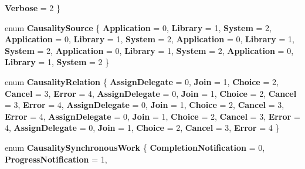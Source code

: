 \begin{DoxyCompactItemize}
{\bfseries Verbose} = 2
 \}
\item 
\mbox{\label{namespace_windows_1_1_foundation_1_1_diagnostics_a3a370b356cb758e027ffea6414919c72}} 
enum {\bfseries Causality\+Source} \{ \newline
{\bfseries Application} = 0, 
{\bfseries Library} = 1, 
{\bfseries System} = 2, 
{\bfseries Application} = 0, 
\newline
{\bfseries Library} = 1, 
{\bfseries System} = 2, 
{\bfseries Application} = 0, 
{\bfseries Library} = 1, 
\newline
{\bfseries System} = 2, 
{\bfseries Application} = 0, 
{\bfseries Library} = 1, 
{\bfseries System} = 2, 
\newline
{\bfseries Application} = 0, 
{\bfseries Library} = 1, 
{\bfseries System} = 2
 \}
\item 
\mbox{\label{namespace_windows_1_1_foundation_1_1_diagnostics_a45d3c9f2fddbec91a3035d3e79a246c8}} 
enum {\bfseries Causality\+Relation} \{ \newline
{\bfseries Assign\+Delegate} = 0, 
{\bfseries Join} = 1, 
{\bfseries Choice} = 2, 
{\bfseries Cancel} = 3, 
\newline
{\bfseries Error} = 4, 
{\bfseries Assign\+Delegate} = 0, 
{\bfseries Join} = 1, 
{\bfseries Choice} = 2, 
\newline
{\bfseries Cancel} = 3, 
{\bfseries Error} = 4, 
{\bfseries Assign\+Delegate} = 0, 
{\bfseries Join} = 1, 
\newline
{\bfseries Choice} = 2, 
{\bfseries Cancel} = 3, 
{\bfseries Error} = 4, 
{\bfseries Assign\+Delegate} = 0, 
\newline
{\bfseries Join} = 1, 
{\bfseries Choice} = 2, 
{\bfseries Cancel} = 3, 
{\bfseries Error} = 4, 
\newline
{\bfseries Assign\+Delegate} = 0, 
{\bfseries Join} = 1, 
{\bfseries Choice} = 2, 
{\bfseries Cancel} = 3, 
\newline
{\bfseries Error} = 4
 \}
\item 
\mbox{\label{namespace_windows_1_1_foundation_1_1_diagnostics_a63986dc9acde6ceb9a128207a5bd1e56}} 
enum {\bfseries Causality\+Synchronous\+Work} \{ \newline
{\bfseries Completion\+Notification} = 0, 
{\bfseries Progress\+Notification} = 1, 

\end{DoxyCompactItemize}
